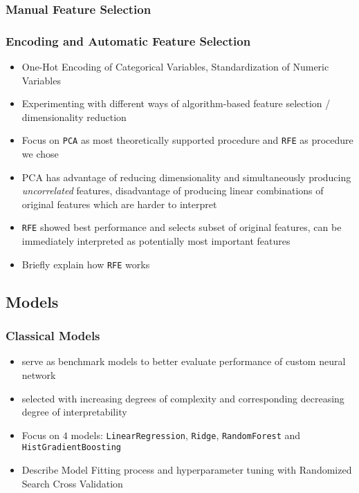 \documentclass[12pt, letterpaper]{article}
\begin{document}
\subsubsection{Manual Feature Selection} %


\subsubsection{Encoding and Automatic Feature Selection} %
\begin{itemize}
    \item One-Hot Encoding of Categorical Variables, Standardization of Numeric Variables
    \item Experimenting with different ways of algorithm-based feature selection / dimensionality reduction
    \item Focus on \texttt{PCA} as most theoretically supported procedure and \texttt{RFE} as procedure we chose
    \item PCA has advantage of reducing dimensionality and simultaneously producing \emph{uncorrelated} features, disadvantage of producing linear combinations of original features which are harder to interpret
    \item \texttt{RFE} showed best performance and selects subset of original features, can be immediately interpreted as potentially most important features
    \item Briefly explain how \texttt{RFE} works
\end{itemize}


\subsection{Models} %

\subsubsection{Classical Models} %
\begin{itemize}
    \item serve as benchmark models to better evaluate performance of custom neural network
    \item selected with increasing degrees of complexity and corresponding decreasing degree of interpretability
    \item Focus on $4$ models: \texttt{LinearRegression}, \texttt{Ridge}, \texttt{RandomForest} and \texttt{HistGradientBoosting}
    \item Describe Model Fitting process and hyperparameter tuning with Randomized Search Cross Validation
\end{itemize}
\end{document}
